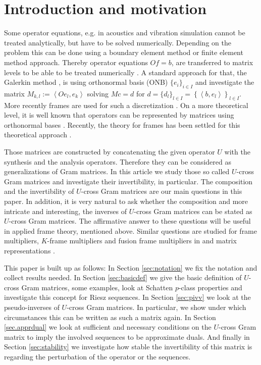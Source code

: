 \documentclass{birkjour}
\theoremstyle{definition}
\theoremstyle{remark}
\numberwithin{equation}{section}
\begin{document}
\section{Introduction and motivation}
Some operator equations, e.g. in acoustics \cite{Kreuzeretal09} and vibration simulation \cite{kreizxxl1} cannot be treated analytically, but have to be solved numerically. Depending on the problem this can be done using a boundary element method \cite{sauter2010boundary} or finite element method \cite{brennscott1} approach. Thereby
operator equations $O f = b$, are transferred to matrix levels to be able to be treated numerically \cite{sauter2010boundary}.
A standard approach for that, the Galerkin method \cite{HarSch06}, is using orthonormal basis (ONB) $\{e_i\}_{i\in I}$ and investigate the matrix
$M_{k,l} :=\left\langle O e_l, e_k\right\rangle$ \cite{HarSch06} solving $M c = d$  for $d = \{d_l\}_{l\in I}= \left\{\left< b , e_l \right>\right\}_{l\in I}$. 
More recently frames are used for such a discretization \cite{xxlhar18,Stevenson03}. On a more theoretical level, it is well known that operators can be represented by matrices using orthonormal bases \cite{gohberg1}.  Recently,  the theory for frames has been settled for this theoretical approach \cite{xxlframoper1,xxlhar18,xxlriek11}.

Those matrices are constructed by concatenating the given operator $U$ with the synthesis and the analysis operators. Therefore they can be considered as generalizations of Gram matrices.
In this article we study those so called $U$-cross Gram matrices and investigate their invertibility, in particular.
The composition and the invertibility of $U$-cross Gram
matrices are our main questions in this paper. In addition, it
is very natural to ask whether the composition and more intricate and interesting, the inverses of $U$-cross
Gram matrices can be stated as  $U$-cross Gram matrices.
The affirmative answer to these questions will be useful in applied frame theory, mentioned above.
Similar questions are studied  for
frame multipliers, $K$-frame multipliers and fusion frame multipliers in \cite{xxlmult1,mitrak,mitra,uncconv2011, balsto09new}  and matrix representations  \cite{xxlriek11,xxlrieck11,harbr08}.


This paper is built up as follows: In Section \ref{sec:notation} we fix the notation and collect results needed.
In Section \ref{sec:basicdef} we give the basic definition of $U$-cross Gram matrices, some examples, look at Schatten $p$-class properties and investigate this concept for Riesz sequences.
In Section \ref{sec:pivv}  we look at the pseudo-inverses of $U$-cross Gram matrices. In particular, we show under which circumstances this can be written as such a matrix again.
In Section \ref{sec.apprdual} we look at sufficient and necessary conditions on the $U$-cross Gram matrix to imply the involved sequences to be approximate duals. And finally
in Section \ref{sec:stability} we investigate how stable the invertibility of this matrix is regarding the perturbation of the operator or the sequences.
\end{document}
